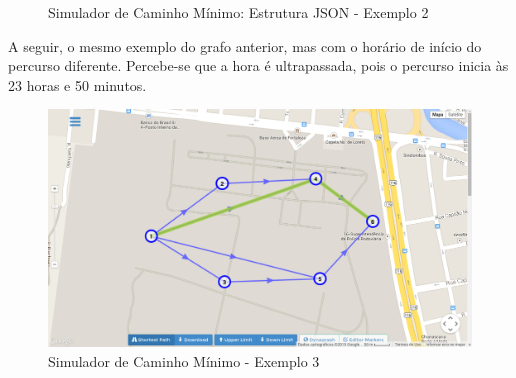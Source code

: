 
\begin{figure}[htbp]
  \caption{Simulador de Caminho Mínimo: Estrutura JSON - Exemplo 2}
  \label{fig:jsondyn2}
\end{figure}
\FloatBarrier

A seguir, o mesmo exemplo do grafo anterior, mas com o horário de início do percurso diferente.
Percebe-se que a hora é ultrapassada, pois o percurso inicia às 23 horas e 50 minutos.

\begin{figure}[htbp]
\centering
 \includegraphics[width=.70\textwidth]{figuras/validacao/ex3.png}
\caption{Simulador de Caminho Mínimo - Exemplo 3}
\label{fig:ex3}
\end{figure}
\FloatBarrier

